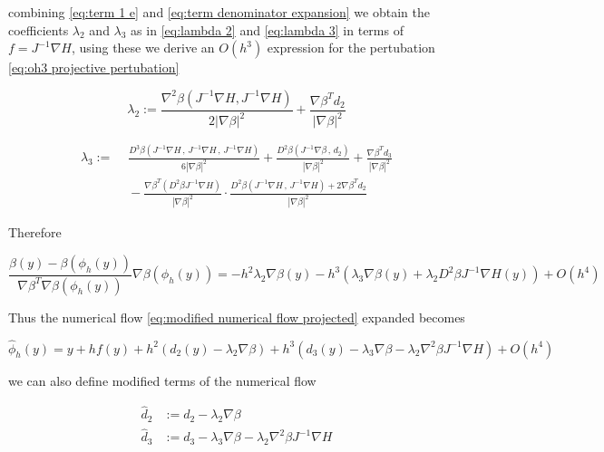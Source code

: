 \documentclass[12pt]{article}
\begin{document}
combining \eqref{eq:term 1 e} and \eqref{eq:term denominator expansion} we obtain the coefficients $\lambda_2$ and $\lambda_3$ as in \eqref{eq:lambda 2} and \eqref{eq:lambda 3} in terms of $f = J^{-1}\nabla H$, using these we derive an $O(h^3)$ expression for the pertubation \eqref{eq:oh3 projective pertubation}

\begin{equation}\label{eq:lambda 2}
    \lambda_2 := \frac{ \nabla^2\beta \left( J^{-1} \nabla H , J^{-1} \nabla H\right) }{2|\nabla\beta|^2} + \frac{\nabla\beta^T d_2}{|\nabla\beta|^2}
\end{equation}

\begin{equation}\label{eq:lambda 3}
\begin{split}
    \lambda_3 := &\,\, \frac{D^3\beta \left( J^{-1} \nabla H\, ,\, J^{-1} \nabla H \, , \, J^{-1}\nabla H \right)}{6 |\nabla\beta|^2} + \frac{D^2\beta\left( J^{-1}\nabla\beta\, , \, d_2 \right)}{|\nabla\beta|^2} + \frac{\nabla\beta^T d_3}{|\nabla\beta|^2} \\
    &\,\, - \frac{\nabla\beta^T \left( D^2\beta J^{-1} \nabla H \right)}{|\nabla\beta|^2} \cdot \frac{D^2\beta\left( J^{-1} \nabla H\, , \, J^{-1}\nabla H\right) + 2\nabla\beta^T d_2}{|\nabla\beta|^2}
\end{split}
\end{equation}

Therefore

\begin{equation}\label{eq:oh3 projective pertubation}
    \frac{\beta(y) - \beta(\phi_h(y))}{\nabla\beta^T\nabla\beta(\phi_h(y))}\nabla\beta(\phi_h(y)) = - h^2 \lambda_2 \nabla\beta(y) - h^3\left( \lambda_3\nabla\beta(y) + \lambda_2 D^2\beta J^{-1}\nabla H(y)  \right)  + O(h^4)
\end{equation}

Thus the numerical flow \eqref{eq:modified numerical flow projected} expanded becomes

\begin{equation}\label{eq:expanded projection modified equation flow}
    \hat \phi_h(y) = y + hf(y) + h^2\left( d_2(y) - \lambda_2\nabla\beta \right) + h^3\left( d_3(y) - \lambda_3\nabla\beta - \lambda_2\nabla^2\beta J^{-1}\nabla H \right) + O(h^4)
\end{equation}

we can also define modified terms of the numerical flow 

\begin{equation}\label{eq:modified numerical flow terms of the equation}
\begin{split}
    \hat d_2 &:= d_2 - \lambda_2\nabla\beta \\
    \hat d_3 &:= d_3 - \lambda_3\nabla\beta - \lambda_2\nabla^2\beta J^{-1}\nabla H
\end{split}
\end{equation}
\end{document}
